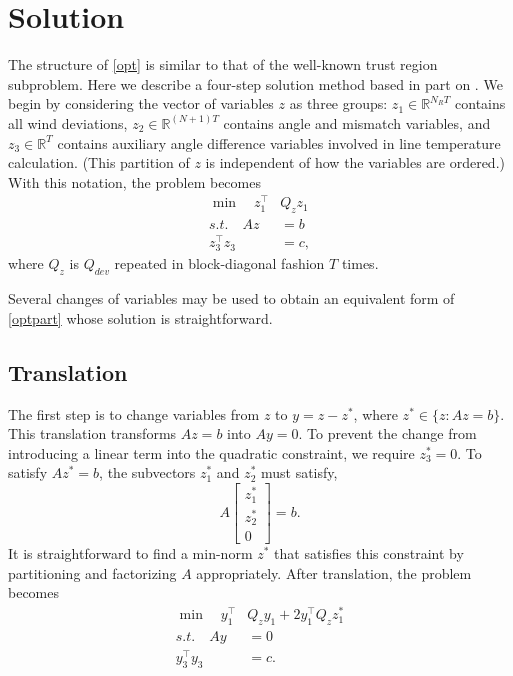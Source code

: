 \documentclass[conference]{IEEEtran}
\begin{document}
\section{Solution}\label{sec:solution}

The structure of \eqref{opt} is similar to that of the well-known trust region subproblem. Here we describe a four-step solution method based in part on \cite{bienstock2014}. We begin by considering the vector of variables $z$ as three groups: $z_1\in\mathbb{R}^{N_RT}$ contains all wind deviations, $z_2\in\mathbb{R}^{(N+1)T}$ contains angle and mismatch variables, and $z_3\in\mathbb{R}^T$ contains auxiliary angle difference variables involved in line temperature calculation. (This partition of $z$ is independent of how the variables are ordered.) With this notation, the problem becomes
\begin{subequations}\label{optpart}
\begin{align}
\min\quad z_1^\top &Q_z z_1 \\
s.t.\quad Az &= b \\
z_3^\top z_3 &= c,
\end{align}
\end{subequations}
where $Q_z$ is $Q_{dev}$ repeated in block-diagonal fashion $T$ times.

Several changes of variables may be used to obtain an equivalent form
of \eqref{optpart} whose solution is straightforward.

\subsection{Translation}

The first step is to change variables from $z$ to $y=z-z^*$, where
$z^*\in\{z:Az=b\}$. This translation transforms $Az=b$ into $Ay=0$. To
prevent the change from introducing a linear term into the quadratic
constraint, we require $z_3^*=0$. To satisfy $Az^*=b$, the subvectors
$z_1^*$ and $z_2^*$ must satisfy,
\[
A \begin{bmatrix} z_1^* \\ z_2^*
\\ 0 \end{bmatrix} = b.
\]
It is straightforward to find a min-norm $z^*$ that satisfies this
constraint by partitioning and factorizing $A$ appropriately. After
translation, the problem becomes
\begin{subequations}\label{opt2}
\begin{align}
\label{opt2:obj} \min\quad y_1^\top &Q_z y_1 + 2 y_1^\top Q_z z_1^* \\
\label{opt2:lin} s.t.\quad Ay &= 0 \\
\label{opt2:quad} y_3^\top y_3 &= c.
\end{align}
\end{subequations}
\end{document}
